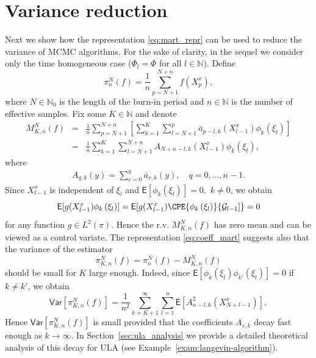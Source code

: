 \documentclass[bj]{imsart}
\def\PE{\mathsf{E}}
\def\PVar{\mathsf{Var}}
\def\nset{\mathbb{N}}
\begin{document}
\section{Variance reduction}
Next we show how  the representation \eqref{eq:mart_repr} can be used to  reduce the variance of MCMC algorithms.  For the sake of clarity, in the sequel we consider only the time homogeneous case ($\Phi_l = \Phi$ for all $l \in \nset$). Define
\begin{equation}\label{eq:29032018a2}
\pi_{n}^{N}(f)= \frac{1}{n} \sum_{p=N+1}^{N+n} f(X^x_{p}),
\end{equation}
where $N\in\mathbb N_0$ is the length of the burn-in period and $n\in\mathbb N$ is
the number of effective samples.
Fix some $K\in\mathbb N$ and denote
\begin{eqnarray}
\nonumber
M_{K,n}^N(f) &=&\frac{1}{n}\sum_{p=N+1}^{N+n}\left[\sum_{k=1}^{K}\sum_{l=N+1}^{p} \bar a_{p-l,k}(X^x_{l-1})\phi_k(\xi_{l})\right]
\\
&=& \frac{1}{n}\sum_{k=1}^{K}\sum_{l=N+1}^{N+n}
A_{N+n-l,k}(X_{l-1}^{x}) \phi_{k}(\xi_{l}),
\label{eq:29032018a5}
\end{eqnarray}
where
\begin{eqnarray}
\label{eq:definition-A-s,k}
A_{q,k}(y)=\sum_{r=0}^q \bar{a}_{r,k}(y),\quad q=0,\ldots,n-1.
\end{eqnarray}
Since \(X^x_{l-1}\) is independent of \(\xi_{l}\) and \(\mathsf{E}[\phi_k(\xi_{l})]=0,\) \(k\neq 0\), we obtain
\[
\PE[g(X^x_{l-1})\phi_{k}\left(\xi_{l}\right)] = \mathsf{E}[g(X^x_{l-1})\CPE{\phi_{k}\left(\xi_{l}\right)}{\mathcal{G}_{l-1}]} = 0
\]
for any  function $g \in L^2(\pi).$  Hence the r.v.  \(M_{K,n}^N(f)\) has zero mean and can be viewed as a control variate.
The representation \eqref{eq:coeff_mart} suggests also that the variance of  the   estimator
\begin{equation}
\label{eq:29032018a3}
\pi_{K,n}^N(f)=\pi_n^N(f)-M_{K,n}^N(f)
\end{equation}
should be small for \(K\) large enough. Indeed, since $\PE[ \phi_k(\xi_l) \phi_{k'}(\xi_l)]=0$ if $k \ne k'$, we obtain
\begin{equation}
\label{eq:expression-variance}
\PVar[\pi_{K,n}^N(f)]=\frac{1}{n^2}\sum_{k=K+1}^{\infty}\sum_{l=1}^{n}\PE[A^2_{n-l,k}(X^x_{N+l-1})],
\end{equation}
Hence $\mathsf{Var}[\pi_{K,n}^N(f)]$ is small provided that the coefficients $A_{s,k}$ decay fast enough as $k\to \infty.$
In   Section~\ref{sec:ula_analysis}   we provide a detailed  theoretical  analysis of  this decay  for   ULA   (see Example~\ref{exam:langevin-algorithm}).
\end{document}

